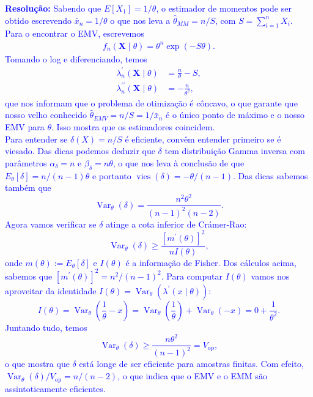 \documentclass[a4paper,10pt, notitlepage]{report}
\newcommand{\vr}{\operatorname{Var}} %
\begin{document}
\textcolor{blue}{
\textbf{Resolução:}
Sabendo que $E[X_1] = 1/\theta$, o estimador de momentos pode ser obtido escrevendo $\bar{x}_n = 1/\theta$ o que nos leva a $\hat{\theta}_{MM} = n/S$, com $S = \sum_{i=1}^n X_i$.
Para o encontrar o EMV, escrevemos
\begin{align*}
 f_n(\boldsymbol{X} \mid \theta)= \theta^n \exp\left(-S\theta\right).
\end{align*}
Tomando o log e diferenciando, temos
\begin{align}
\label{eq:q2:l1}
 \lambda_n^\prime(\boldsymbol{X} \mid \theta) &= \frac{n}{\theta} - S ,\\
 \label{eq:q2:l2}
 \lambda_n^{\prime\prime}(\boldsymbol{X} \mid \theta) &= -\frac{n}{\theta^2},
\end{align}
que nos informam que o problema de otimização é côncavo, o que garante que nosso velho conhecido $\hat{\theta}_{EMV} = n/S = 1/\bar{x}_n$ é o único ponto de máximo e o nosso EMV para $\theta$.
Isso mostra que os estimadores coincidem.
\\
Para entender se $\delta(X)= n/S$ é eficiente, convêm entender primeiro se é viesado. 
Das dicas podemos deduzir que $\delta$ tem distribuição Gamma inversa com parâmetros $\alpha_\delta = n$ e $\beta_\delta = n\theta$, o que nos leva à conclusão de que $E_\theta[\delta] = n/(n-1) \theta$ e portanto $\operatorname{vies}(\delta) = -\theta/(n-1)$.
Das dicas sabemos também que
$$
\vr_\theta(\delta) = \frac{n^2\theta^2}{(n-1)^2(n-2)}.
$$
Agora vamos verificar se $\delta$ atinge a cota inferior de Crámer-Rao:
$$
\vr_\theta(\delta) \geq \frac{[m^\prime(\theta)]^2}{nI(\theta)},
$$
onde $m(\theta) := E_\theta[\delta]$ e $I(\theta)$ é a informação de Fisher.
Dos cálculos acima, sabemos que $[m^\prime(\theta)]^2 = n^2/(n-1)^2$.
Para computar $I(\theta)$ vamos nos aproveitar da identidade $I(\theta) = \vr_\theta(\lambda^\prime(x \mid \theta))$:
$$
I(\theta) = \vr_\theta\left(\frac{1}{\theta}  -x\right) = \vr_\theta\left(\frac{1}{\theta}\right) + \vr_\theta\left(-x\right) = 0 + \frac{1}{\theta^2}.
$$
Juntando tudo, temos
$$
\vr_\theta(\delta) \geq \frac{n\theta^2}{(n-1)^2} = V_{\textrm{op}},
$$
o que mostra que $\delta$ está longe de ser eficiente para amostras finitas.
Com efeito, $\vr_\theta(\delta)/V_{\textrm{op}} = n/(n-2)$, o que indica que o EMV e o EMM são assintoticamente eficientes.
}
\end{document}
